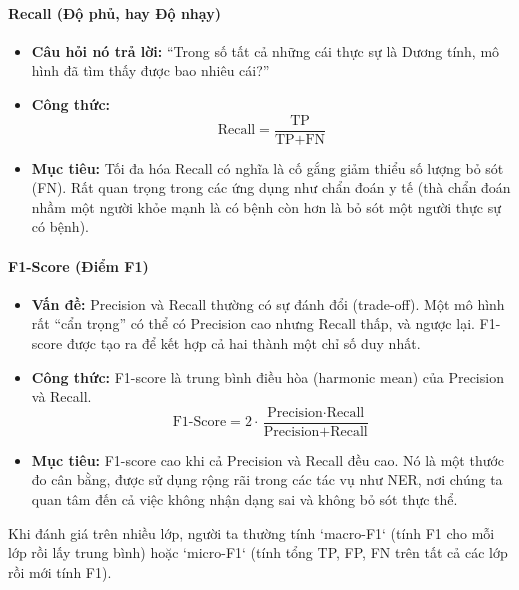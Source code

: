 \paragraph{Recall (Độ phủ, hay Độ nhạy)}
\begin{itemize}
    \item \textbf{Câu hỏi nó trả lời:} “Trong số tất cả những cái thực sự là Dương tính, mô hình đã tìm thấy được bao nhiêu cái?”
    \item \textbf{Công thức:}
        $$ \text{Recall} = \frac{\text{TP}}{\text{TP} + \text{FN}} $$
    \item \textbf{Mục tiêu:} Tối đa hóa Recall có nghĩa là cố gắng giảm thiểu số lượng bỏ sót (FN). Rất quan trọng trong các ứng dụng như chẩn đoán y tế (thà chẩn đoán nhầm một người khỏe mạnh là có bệnh còn hơn là bỏ sót một người thực sự có bệnh).
\end{itemize}

\paragraph{F1-Score (Điểm F1)}
\begin{itemize}
    \item \textbf{Vấn đề:} Precision và Recall thường có sự đánh đổi (trade-off). Một mô hình rất “cẩn trọng” có thể có Precision cao nhưng Recall thấp, và ngược lại. F1-score được tạo ra để kết hợp cả hai thành một chỉ số duy nhất.
    \item \textbf{Công thức:} F1-score là trung bình điều hòa (harmonic mean) của Precision và Recall.
        $$ \text{F1-Score} = 2 \cdot \frac{\text{Precision} \cdot \text{Recall}}{\text{Precision} + \text{Recall}} $$
    \item \textbf{Mục tiêu:} F1-score cao khi cả Precision và Recall đều cao. Nó là một thước đo cân bằng, được sử dụng rộng rãi trong các tác vụ như NER, nơi chúng ta quan tâm đến cả việc không nhận dạng sai và không bỏ sót thực thể.
\end{itemize}
Khi đánh giá trên nhiều lớp, người ta thường tính `macro-F1` (tính F1 cho mỗi lớp rồi lấy trung bình) hoặc `micro-F1` (tính tổng TP, FP, FN trên tất cả các lớp rồi mới tính F1).

